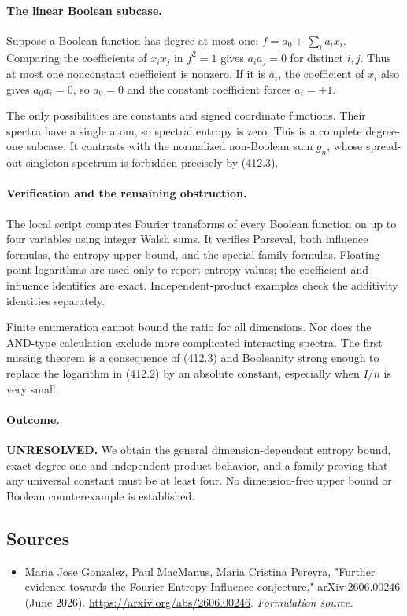\documentclass[11pt]{article}
\begin{document}
\paragraph{The linear Boolean subcase.}
Suppose a Boolean function has degree at most one:
$f=a_0+\sum_i a_i x_i$. Comparing the coefficients of $x_ix_j$ in $f^2=1$ gives $a_ia_j=0$ for distinct $i,j$. Thus at most one nonconstant coefficient is nonzero. If it is $a_i$, the coefficient of $x_i$ also gives $a_0a_i=0$, so $a_0=0$ and the constant coefficient forces $a_i=\pm1$.

The only possibilities are constants and signed coordinate functions. Their spectra have a single atom, so spectral entropy is zero. This is a complete degree-one subcase. It contrasts with the normalized non-Boolean sum $g_n$, whose spread-out singleton spectrum is forbidden precisely by (412.3).

\paragraph{Verification and the remaining obstruction.}
The local script computes Fourier transforms of every Boolean function on up to four variables using integer Walsh sums. It verifies Parseval, both influence formulas, the entropy upper bound, and the special-family formulas. Floating-point logarithms are used only to report entropy values; the coefficient and influence identities are exact. Independent-product examples check the additivity identities separately.

Finite enumeration cannot bound the ratio for all dimensions. Nor does the AND-type calculation exclude more complicated interacting spectra. The first missing theorem is a consequence of (412.3) and Booleanity strong enough to replace the logarithm in (412.2) by an absolute constant, especially when $I/n$ is very small.

\paragraph{Outcome.}
\textbf{UNRESOLVED.} We obtain the general dimension-dependent entropy bound, exact degree-one and independent-product behavior, and a family proving that any universal constant must be at least four. No dimension-free upper bound or Boolean counterexample is established.

\subsection{Sources}
\begin{itemize}
\item[S1]Maria Jose Gonzalez, Paul MacManus, Maria Cristina Pereyra, "Further evidence towards the Fourier Entropy-Influence conjecture," arXiv:2606.00246 (June 2026).
\url{https://arxiv.org/abs/2606.00246}.
\textit{Formulation source.}
\end{itemize}
\end{document}
